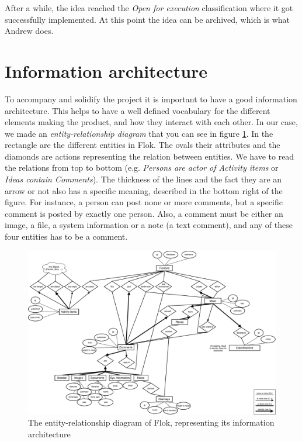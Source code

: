 \documentclass[a4paper,12pt, oneside]{article}
\begin{document}
After a while, the idea reached the \emph{Open for execution} classification where it got successfully implemented.
At this point the idea can be archived, which is what Andrew does.


\section{Information architecture}
To accompany and solidify the project it is important to have a good information architecture.
This helps to have a well defined vocabulary for the different elements making the product, and how they interact with each other.
In our case, we made an \emph{entity-relationship diagram} that you can see in figure \ref{fig.erDiagram}.
In the rectangle are the different entities in Flok.
The ovals their attributes and the diamonds are actions representing the relation between entities.
We have to read the relations from top to bottom (e.g. \emph{Persons are actor of Activity items} or \emph{Ideas contain Comments}).
The thickness of the lines and the fact they are an arrow or not also has a specific meaning, described in the bottom right of the figure.
For instance, a person can post none or more comments, but a specific comment is posted by exactly one person.
Also, a comment must be either an image, a file, a system information or a note (a text comment), and any of these four entities has to be a comment.

\begin{figure}
    \centering
    \includegraphics[width=\textwidth]{images/erDiagram.pdf}
    \caption{The entity-relationship diagram of Flok, representing its information architecture}
    \label{fig.erDiagram}
\end{figure}
\end{document}
